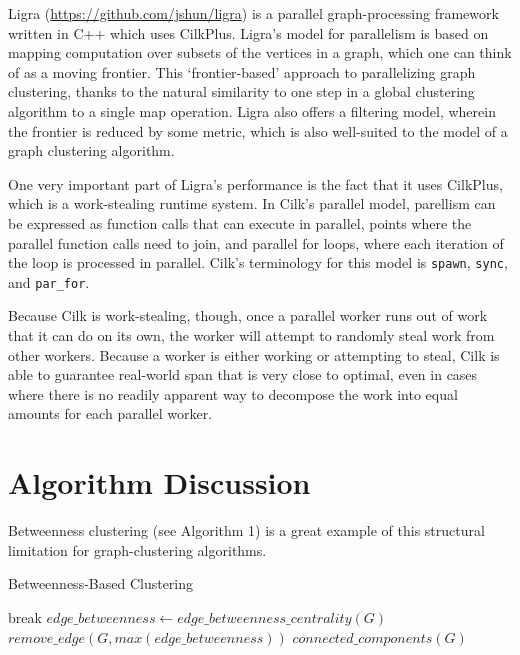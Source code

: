 Ligra (\url{https://github.com/jshun/ligra}) is a parallel
graph-processing framework written in C++ which uses CilkPlus. Ligra's
model for parallelism is based on mapping computation over subsets of
the vertices in a graph, which one can think of as a moving frontier.
This `frontier-based' approach to parallelizing graph clustering, thanks
to the natural similarity to one step in a global clustering algorithm
to a single map operation. Ligra also offers a filtering model, wherein
the frontier is reduced by some metric, which is also well-suited to the
model of a graph clustering algorithm.

One very important part of Ligra's performance is the fact that it uses
CilkPlus, which is a work-stealing runtime system. In Cilk's parallel
model, parellism can be expressed as function calls that can execute in
parallel, points where the parallel function calls need to join, and
parallel for loops, where each iteration of the loop is processed in
parallel. Cilk's terminology for this model is \texttt{spawn}, 
\texttt{sync}, and \texttt{par\_for}.

Because Cilk is work-stealing, though, once a parallel worker runs out
of work that it can do on its own, the worker will attempt to randomly
steal work from other workers. Because a worker is either working or
attempting to steal, Cilk is able to guarantee real-world span that is
very close to optimal, even in cases where there is no readily apparent
way to decompose the work into equal amounts for each parallel worker.

\section{Algorithm Discussion}

Betweenness clustering (see Algorithm 1) is a great example of this
structural limitation for graph-clustering algorithms.

{\centering
\begin{minipage}{0.9\linewidth}
\begin{algorithm}[H]
	\caption{Betweenness-Based Clustering}



	{
		{
			{break\;}
			$edge\_betweenness \gets edge\_betweenness\_centrality(G)$\;
			$remove\_edge(G, max(edge\_betweenness))$\;
		}
		\Return $connected\_components(G)$\;
	}
\end{algorithm}
\end{minipage}
}

